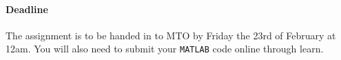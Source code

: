 \documentclass{scrartcl}
\begin{document}
\paragraph{Deadline} The assignment is to be handed in to MTO by Friday the 23rd of February at 12am. You will also 
need to submit your  \texttt{MATLAB} code online through learn. 

\newpage




 







	
    
\end{document}
